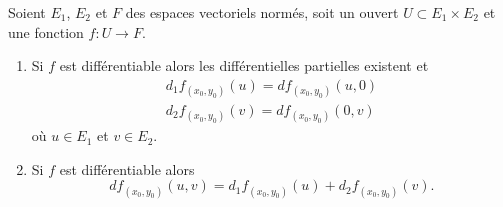 \begin{proposition} \label{PropLDN_nHWDF}
	Soient \( E_1\), \( E_2\) et \( F\) des espaces vectoriels normés, soit un ouvert \( U\subset E_1\times E_2\) et une fonction \( f\colon U\to F\).
	\begin{enumerate}
		\item   \label{ItemRDD_oPmXVi}
		      Si \( f\) est différentiable alors les différentielles partielles existent et
		      \begin{subequations}
			      \begin{align}
				      d_1f_{(x_0,y_0)}(u)=df_{(x_0,y_0)}(u,0) \\
				      d_2f_{(x_0,y_0)}(v)=df_{(x_0,y_0)}(0,v)
			      \end{align}
		      \end{subequations}
		      où \( u\in E_1\) et \( v\in E_2\).
		\item
		      Si \( f\) est différentiable alors
		      \begin{equation}
			      df_{(x_0,y_0)}(u,v)=d_1f_{(x_0,y_0)}(u)+d_2f_{(x_0,y_0)}(v).
		      \end{equation}
	\end{enumerate}
\end{proposition}

